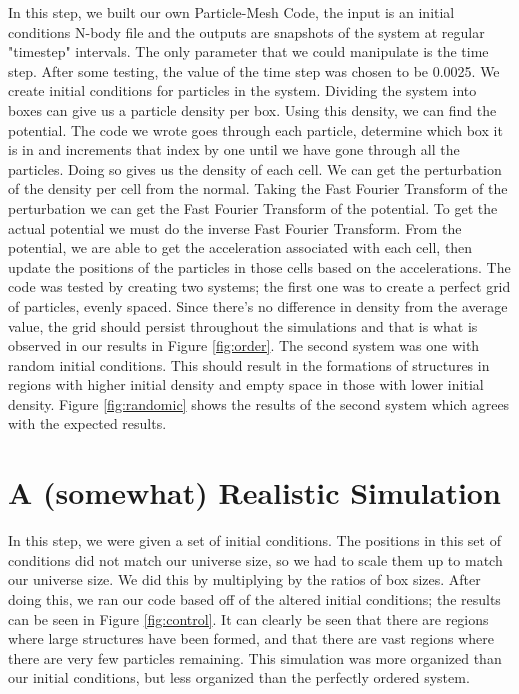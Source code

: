 \documentclass[10pt]{article}
\begin{document}
	In this step, we built our own Particle-Mesh Code, the input is an initial conditions N-body file and the outputs are snapshots of the system at regular "timestep" intervals. The only parameter that we could manipulate is the time step. After some testing, the value of the time step was chosen to be 0.0025. We create initial conditions for particles in the system. Dividing the system into boxes can give us a particle density per box. Using this density, we can find the potential. The code we wrote goes through each particle, determine which box it is in and increments that index by one until we have gone through all the particles. Doing so gives us the density of each cell. We can get the perturbation of the density per cell from the normal. Taking the Fast Fourier Transform of the perturbation we can get the Fast Fourier Transform of the potential. To get the actual potential we must do the inverse Fast Fourier Transform. From the potential, we are able to get the acceleration associated with each cell, then update the positions of the particles in those cells based on the accelerations. 
	The code was tested by creating two systems; the first one was to create a perfect grid of particles, evenly spaced. Since there’s no difference in density from the average value, the grid should persist throughout the simulations and that is what is observed in our results in Figure \ref{fig:order}{}. The second system was one with random initial conditions. This should result in the formations of structures in regions with higher initial density and empty space in those with lower initial density. Figure \ref{fig:randomic}{} shows the results of the second system which agrees with the expected results.       




\section{A (somewhat) Realistic Simulation}
	In this step, we were given a set of initial conditions. The positions in this set of conditions did not match our universe size, so we had to scale them up to match our universe size. We did this by multiplying by the ratios of box sizes. After doing this, we ran our code based off of the altered initial conditions; the results can be seen in Figure \ref{fig:control}{}. It can clearly be seen that there are regions where large structures have been formed, and that there are vast regions where there are very few particles remaining.
	This simulation was more organized than our initial conditions, but less organized than the perfectly ordered system.
	
\end{document}
